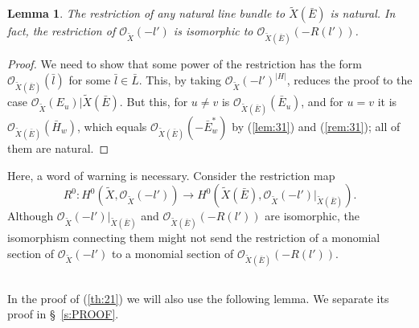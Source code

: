 \documentclass[10pt,a4paper]{amsart}
\numberwithin{equation}{section}
\numberwithin{equation}{subsection}
\theoremstyle{plain}
\newtheorem{lemma}[equation]{Lemma}
\theoremstyle{definition}
\begin{document}
\begin{lemma}\label{lem:32} The restriction of any natural line
bundle to ${\widetilde{X}(\bar{E})}$ is natural. In fact, the restriction of
${\mathcal{O}}_{\widetilde{X}}(-l')$ is isomorphic to ${\mathcal{O}}_{\widetilde{X}(\bar{E})}(-R(l'))$.
\end{lemma}

\begin{proof}
We need to show that some power of the restriction has the form
${\mathcal{O}}_{\widetilde{X}(\bar{E})}(\bar{l})$ for some $\bar{l}\in\bar{L}$. This, by
taking ${\mathcal{O}}_{\widetilde{X}}(-l')^{|H|}$, reduces the proof to the
case ${\mathcal{O}}_{\widetilde{X}}(E_u)|{\widetilde{X}(\bar{E})}$. But this, for $u\not=v$ is
${\mathcal{O}}_{\widetilde{X}(\bar{E})}(\bar{E}_u)$, and for $u=v$ it is
${\mathcal{O}}_{\widetilde{X}(\bar{E})}(\bar{H}_w)$, which equals ${\mathcal{O}}_{\widetilde{X}(\bar{E})}(-\bar{E}^*_w)$
by  (\ref{lem:31}) and  (\ref{rem:31}); all of them are natural.
\end{proof}
Here, a word of warning is necessary.  Consider the restriction
map
\begin{equation*}
R^0:H^0(\widetilde{X},{\mathcal{O}}_{\widetilde{X}}(-l'))\longrightarrow
H^0(\widetilde{X}(\bar{E}),{\mathcal{O}}_{\widetilde{X}}(-l')|_{\widetilde{X}(\bar{E})}).
\end{equation*}
Although ${\mathcal{O}}_{\widetilde{X}}(-l')|_{\widetilde{X}(\bar{E})}$ and
${\mathcal{O}}_{\widetilde{X}(\bar{E})}(-R(l'))$ are isomorphic, the
isomorphism connecting them might not send the restriction of a
monomial section of ${\mathcal{O}}_{\widetilde{X}}(-l')$ to a monomial
section of ${\mathcal{O}}_{\widetilde{X}(\bar{E})}(-R(l'))$.

\subsection{}\label{ss:ktl} In the proof of (\ref{th:21})
we will also use the following lemma. We separate its proof in \S
\,\ref{s:PROOF}.
\end{document}
